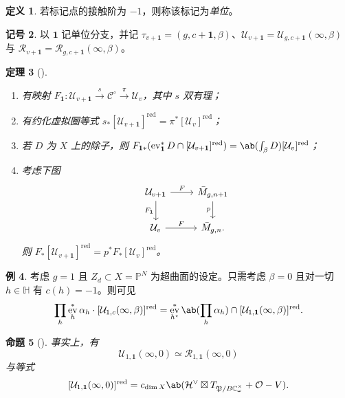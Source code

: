 \documentclass{amsart}
\newtheorem{thm}{定理}[section]
\newtheorem{prop}[thm]{命题}
\theoremstyle{definition}
\newtheorem{defn}[thm]{定义}
\newtheorem{exm}[thm]{例}
\newtheorem{notn}[thm]{记号}
\theoremstyle{remark}
\theoremstyle{plain}
\theoremstyle{definition}
\theoremstyle{remark}
\newcommand{\C}{\mathbb{C}}
\renewcommand{\H}{\mathbb{H}}
\renewcommand{\P}{\mathbb{P}}
\newcommand{\mc}[1]{\mathcal{#1}}
\newcommand{\mf}[1]{\mathfrak{#1}}
\newcommand{\mr}[1]{\mathrm{#1}}
\newcommand{\on}[1]{\operatorname{#1}}
\newcommand{\1}{\mathbf{1}}
\newcommand{\2}{\mathbf{2}}
\newcommand{\3}{\mathbf{3}}
\DeclareMathOperator{\ev}{ev}
\begin{document}
\begin{defn}
    若标记点的接触阶为 \(-1\)，则称该标记为\textit{单位}。
\end{defn}

\begin{notn}
    以 \(\1\) 记单位分支，并记 \(\tau_{v+\1} = (g, c+\1, \beta)\)、\(\mc{U}_{v+\1} = \mc{U}_{g, c+\1}(\infty, \beta)\) 与 \(\mc{R}_{v+\1} = \mc{R}_{g, c+\1}(\infty, \beta)\)。
\end{notn}

\begin{thm}[{\cite[Theorems~1.16--1.17]{CJRpunctured}}]\leavevmode
    \begin{enumerate}
        \item 有映射 \(F_{\1} \colon \mc{U}_{v+\1} \xrightarrow{s} \mc{C}^{\circ} \xrightarrow{\pi} \mc{U}_v\)，其中 \(s\) 双有理；
        \item 有约化虚拟圈等式 \(s_* [\mc{U}_{v+\1}]^{\on{red}} = \pi^* [\mc{U}_v]^{\on{red}}\)；
        \item 若 \(D\) 为 \(X\) 上的除子，则 \(F_{\1 *} (\ev_{\1}^* D \cap [\mc{U}_{v+\1}]^{\on{red}}) = \ab(\int_{\beta} D) [\mc{U}_v]^{\on{red}}\)；
        \item 考虑下图
            \begin{equation*}
            \begin{tikzcd}
                \mc{U}_{v+\1} \ar{r}{F} \ar{d}[swap]{F_{\1}} & \bar{M}_{g,n+1} \ar{d}[swap]{p} \\
                \mc{U}_v \ar{r}{F} & \bar{M}_{g,n}.
            \end{tikzcd}
            \end{equation*}
            则 \(F_* [\mc{U}_{v+\1}]^{\on{red}} = p^* F_* [\mc{U}_v]^{\on{red}}\)。
    \end{enumerate}
\end{thm}

\begin{exm}
    考虑 \(g = 1\) 且 \(Z_d \subset X = \P^N\) 为超曲面的设定。只需考虑 \(\beta = 0\) 且对一切 \(h \in \H\) 有 \(c(h) = -1\)。则可见
    \[ \prod_h \ev_h^* \alpha_h \cdot [\mc{U}_{1,c}(\infty,\beta)]^{\mr{red}} = \ev_{h^{\star}}^* \ab(\prod_h \alpha_h) \cap [\mc{U}_{1,\1}(\infty,\beta)]^{\on{red}}. \]
\end{exm}

\begin{prop}[{\cite{CJRpunctured}}]
    事实上，有
    \[ \mc{U}_{1,\1}(\infty, 0) \simeq \mc{R}_{1,\1}(\infty, 0) \]
    与等式
    \[ [\mc{U}_{1,\1}(\infty, 0)]^{\on{red}} = c_{\dim X} \ab(\mc{H}^{\vee} \boxtimes T_{\mf{P}/B\C_{\omega}^{\times}} + \mc{O} - V). \]
\end{prop}
\end{document}
